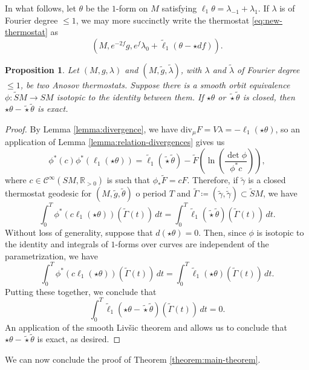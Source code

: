 \documentclass[reqno,12pt,letterpaper]{amsart}
\newtheorem{proposition}{Proposition}[section]
\theoremstyle{definition}
\theoremstyle{remark}
\theoremstyle{definition}
\numberwithin{equation}{section}
\newcommand{\R}{\mathbb{R}}
\renewcommand{\div}{\mathrm{div}}
\begin{document}
In what follows, let $\theta$ be the $1$-form on $M$ satisfying $\ell_1\theta = \lambda_{-1}+\lambda_1$. If $\lambda$ is of Fourier degree $\leq 1$, we may more succinctly write the thermostat \eqref{eq:new-thermostat} as
$$(M, e^{-2f}g, e^f \lambda_0 + \tilde{\ell}_1(\theta-\star df)).$$

\begin{proposition}\label{proposition:gaussian-katok}
Let $(M, g, \lambda)$ and $(M, \tilde{g}, \tilde{\lambda})$, with $\lambda$ and $\tilde{\lambda}$ of Fourier degree $\leq 1$, be two Anosov thermostats. Suppose there is a smooth orbit equivalence $\phi : \widetilde{S}M\to SM$ isotopic to the identity between them. If $\star \theta$ or $\tilde{\star}\tilde{\theta}$ is closed, then $\star \theta - \tilde{\star} \tilde{\theta}$ is exact.
\end{proposition}
\begin{proof}
By Lemma \ref{lemma:divergence}, we have $\div_\mu F =V\lambda=- \ell_1(\star \theta)$, so an application of Lemma \ref{lemma:relation-divergences} gives us
$$\phi^*(c)\phi^*( \ell_1(\star\theta))=\tilde{\ell}_1(\tilde{\star}\tilde{\theta})-\widetilde{F}\left(\ln \left(\dfrac{\det \phi}{\phi^*c}\right)\right),$$
where $c\in \mathcal{C}^\infty(SM, \R_{>0})$ is such that $\phi_* \widetilde{F}=cF$. Therefore, if $\tilde{\gamma}$ is a closed thermostat geodesic for $(M, \tilde{g}, \tilde{\theta})$ o period $T$ and $\widetilde{\Gamma} \coloneqq(\tilde{\gamma}, \dot{\tilde{\gamma}})\subset \widetilde{S}M$, we have
$$\int_0^T \phi^*(c\ell_1(\star\theta))(\widetilde{\Gamma}(t))\, dt = \int_{0}^T \tilde{\ell}_1(\tilde{\star}\tilde{\theta})(\widetilde{\Gamma}(t))\, dt.$$
Without loss of generality, suppose that $d(\star \theta)=0$. Then, since $\phi$ is isotopic to the identity and integrals of $1$-forms over curves are independent of the parametrization, we have
$$ \int_0^T \phi^*(c\ell_1(\star\theta))(\widetilde{\Gamma}(t))\, dt = \int_0^T \tilde{\ell}_1(\star\theta)(\widetilde{\Gamma}(t))\, dt .$$
Putting these together, we conclude that
$$\int_{0}^T\tilde{\ell}_1(\star \theta - \tilde{\star}\tilde{\theta})(\widetilde{\Gamma}(t))\, dt=0.$$
An application of the smooth Livšic theorem \cite[Theorem 2.1]{de-la-llave86} and \cite[Theorem B]{dairbekov07} allows us to conclude that $\star \theta - \tilde{\star}\tilde{\theta}$ is exact, as desired. 
\end{proof}

We can now conclude the proof of Theorem \ref{theorem:main-theorem}.
\end{document}
